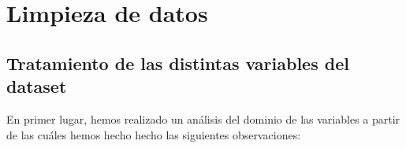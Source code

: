\documentclass[
]{article}
\begin{document}
\hypertarget{limpieza-de-datos}{%
\section{Limpieza de datos}\label{limpieza-de-datos}}

\hypertarget{tratamiento-de-las-distintas-variables-del-dataset}{%
\subsection{Tratamiento de las distintas variables del
dataset}\label{tratamiento-de-las-distintas-variables-del-dataset}}

En primer lugar, hemos realizado un análisis del dominio de las
variables a partir de las cuáles hemos hecho hecho las siguientes
observaciones:
\end{document}
